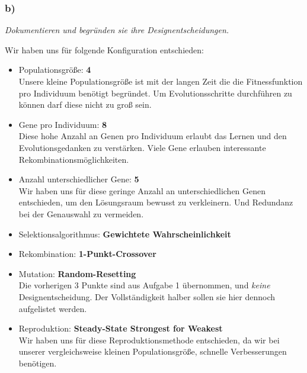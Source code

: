 \documentclass[12pt, a4paper]{article}
\begin{document}
\subsubsection*{b)}
\textit{Dokumentieren und begründen sie ihre Designentscheidungen.}

Wir haben uns für folgende Konfiguration entschieden:

\begin{itemize}
\item Populationsgröße: \textbf{4}\\
Unsere kleine Populationsgröße ist mit der langen Zeit die die
Fitnessfunktion pro Individuum benötigt begründet. Um
Evolutionsschritte durchführen zu können darf diese nicht zu groß sein.
\item Gene pro Individuum: \textbf{8}\\
Diese hohe Anzahl an Genen pro Individuum erlaubt das Lernen und den
Evolutionsgedanken zu verstärken. Viele Gene erlauben interessante Rekombinationsmöglichkeiten.
\item Anzahl unterschiedlicher Gene: \textbf{5}\\
Wir haben uns für diese geringe Anzahl an unterschiedlichen Genen
entschieden, um den Lösungsraum bewusst zu verkleinern. Und Redundanz
bei der Genauswahl zu vermeiden.
\item Selektionsalgorithmus: \textbf{Gewichtete Wahrscheinlichkeit}
\item Rekombination: \textbf{1-Punkt-Crossover}
\item Mutation: \textbf{Random-Resetting}\\
Die vorherigen 3 Punkte sind aus Aufgabe 1 übernommen, und
\textit{keine} Designentscheidung. Der Vollständigkeit halber sollen sie hier
dennoch aufgelistet werden.
\item Reproduktion: \textbf{Steady-State Strongest for Weakest}\\
Wir haben uns für diese Reproduktionsmethode entschieden, da wir bei
unserer vergleichsweise kleinen Populationsgröße, schnelle
Verbesserungen benötigen.

\end{itemize}
\end{document}
